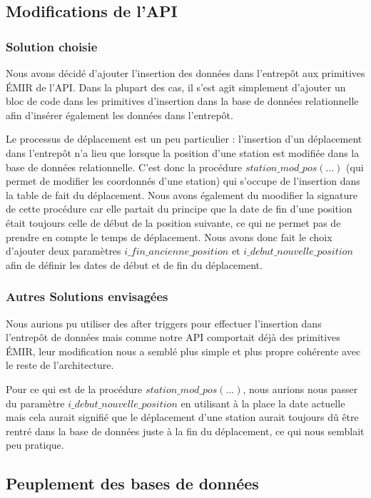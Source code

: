 \documentclass{article}
\begin{document}
\subsection{Modifications de l'API}
\subsubsection*{Solution choisie}
Nous avons décidé d'ajouter l'insertion des données dans l'entrepôt aux primitives
ÉMIR de l'API. Dans la plupart des cas, il s'est agit simplement d'ajouter un bloc de code 
dans les primitives d'insertion dans la base de données relationnelle
afin d'insérer également les données dans l'entrepôt.

Le processus de déplacement est un peu particulier : l'insertion d'un déplacement
dans l'entrepôt n'a lieu que lorsque la position d'une station est modifiée dans
la base de données relationnelle. C'est donc la procédure 
$station\_mod\_pos(...)$ (qui permet de modifier les coordonnés d'une station) qui 
s'occupe de l'insertion dans la table de fait du déplacement. Nous avons également
du moodifier la signature de cette procédure car elle partait du principe que la date
de fin d'une position était toujours celle de début de la position suivante, ce qui
ne permet pas de prendre en compte le temps de déplacement. Nous avons donc fait le
choix d'ajouter deux paramètres $i\_fin\_ancienne\_position$ et $i\_debut\_nouvelle\_position$
afin de définir les dates de début et de fin du déplacement.

\subsubsection*{Autres Solutions envisagées}
Nous aurions pu utiliser des after triggers pour effectuer l'insertion dans l'entrepôt
de données mais comme notre API comportait déjà des primitives ÉMIR, leur modification
nous a semblé plus simple et plus propre cohérente avec le reste de l'architecture.

Pour ce qui est de la procédure $station\_mod\_pos(...)$, nous aurions nous passer
du paramètre $i\_debut\_nouvelle\_position$ en utilisant à la place la date actuelle
mais cela aurait signifié que le déplacement d'une station aurait toujours dû être
rentré dans la base de données juste à la fin du déplacement, ce qui nous semblait
peu pratique.

\subsection{Peuplement des bases de données}
\end{document}
